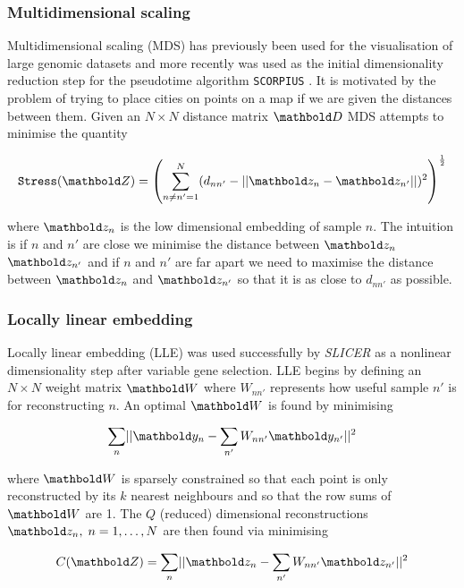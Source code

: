 \subsubsection{Multidimensional scaling}

Multidimensional scaling (MDS) has previously been used for the visualisation of large genomic datasets \cite{tzeng2008multidimensional} and more recently was used as the initial dimensionality reduction step for the pseudotime algorithm \texttt{SCORPIUS} \cite{cannoodt2016scorpius}. It is motivated by the problem of trying to place cities on points on a map if we are given the distances between them. Given an $N \times N$ distance matrix $\mbD$ MDS attempts to minimise the quantity

\begin{equation}
  \texttt{Stress}(\mbZ) = \left(
  \sum_{n \neq n' = 1}^N (d_{nn'} - \lvert \lvert \mbz_n - \mbz_{n'} \rvert \rvert)^2
  \right)^{\frac{1}{2}}
\end{equation}

where $\mbz_n$ is the low dimensional embedding of sample $n$. The intuition is if $n$ and $n'$ are close we minimise the distance between  $\mbz_n$  $\mbz_{n'}$ and if $n$ and $n'$ are far apart we need to maximise the distance between  $\mbz_n$  and $\mbz_{n'}$ so that it is as close to $d_{nn'}$ as possible.

\subsubsection{Locally linear embedding} \label{sec:lle}

Locally linear embedding (LLE) was used successfully by \emph{SLICER} \cite{welch2016slicer} as a nonlinear dimensionality step after variable gene selection. LLE begins by defining an $N \times N$ weight matrix $\mbW$ where $W_{nn'}$ represents how useful sample $n'$ is for reconstructing $n$. An optimal $\mbW$ is found by minimising

\begin{equation}
  \sum_{n} \lvert \lvert \mby_n - \sum_{n'} W_{nn'} \mby_{n'} \rvert \rvert^2
\end{equation}

where $\mbW$ is sparsely constrained so that each point is only reconstructed by its $k$ nearest neighbours and so that the row sums of $\mbW$ are 1. The $Q$ (reduced) dimensional reconstructions $\mbz_n, \; n = 1, \ldots, N$ are then found via minimising

\begin{equation}
  C(\mbZ) = \sum_{n} \lvert \lvert \mbz_n - \sum_{n'} W_{nn'} \mbz_{n'} \rvert \rvert^2
\end{equation}

